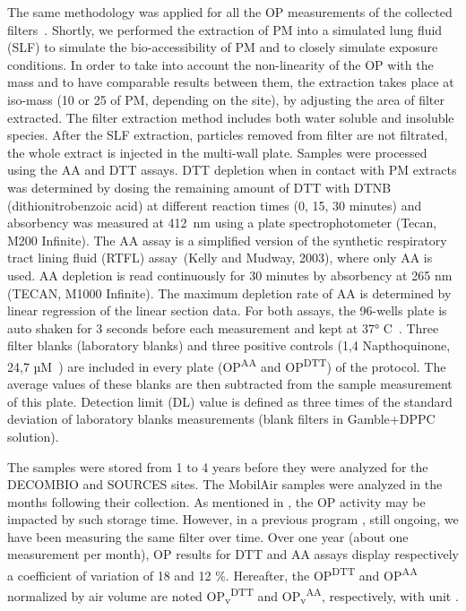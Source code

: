 \documentclass[acp]{copernicus}
\begin{document}
The same methodology was applied for all the OP measurements of the
collected filters~\citep{calasImportance2017,calasComparison2018,calasSeasonal2019}. Shortly, we
performed the extraction of PM into a simulated lung fluid (SLF) to
simulate the bio-accessibility of PM and to closely simulate exposure
conditions. In order to take into account the non-linearity of the OP
with the mass and to have comparable results between them, the
extraction takes place at iso-mass (10 or 25 of PM, depending on the
site), by adjusting the area of filter extracted. The filter extraction
method includes both water soluble and insoluble species. After the SLF
extraction, particles removed from filter are not filtrated, the whole
extract is injected in the multi-wall plate. Samples were processed
using the AA and DTT assays. DTT depletion when in contact with PM
extracts was determined by dosing the remaining amount of DTT with DTNB
(dithionitrobenzoic acid) at different reaction times (0, 15, 30
minutes) and absorbency was measured at 412~nm using a plate
spectrophotometer (Tecan, M200 Infinite). The AA assay is a simplified
version of the synthetic respiratory tract lining fluid (RTFL)
assay~(Kelly and Mudway, 2003), where only AA is used. AA depletion is
read continuously for 30 minutes by absorbency at 265 nm~ (TECAN, M1000
Infinite). The maximum depletion rate of AA is determined by linear
regression of the linear section data. For both assays, the 96-wells
plate is auto shaken for 3 seconds before each measurement and kept at
37° C~. Three filter blanks (laboratory blanks) and three positive
controls (1,4 Napthoquinone, 24,7 µM~) are included in every plate
(OP\textsuperscript{AA} and OP\textsuperscript{DTT}) of the protocol.
The average values of these blanks are then subtracted from the sample
measurement of this plate. Detection limit (DL) value is defined as
three times of the standard deviation of laboratory blanks measurements
(blank filters in Gamble+DPPC solution).

The samples were stored from 1 to 4 years before they were analyzed for
the DECOMBIO and SOURCES sites. The MobilAir samples were analyzed in
the months following their collection. As mentioned in \citet{vermaFractionating2015}, the
OP activity may be impacted by such storage time. However, in
a previous program \citep{ansesexposureEtude2017}, still ongoing, we have been
measuring the same filter over time. Over one year (about one
measurement per month), OP results for DTT and AA assays display
respectively a coefficient of variation of 18 and 12 \%. Hereafter, the
OP\textsuperscript{DTT} and OP\textsuperscript{AA} normalized by air
volume are noted OP\textsubscript{v}\textsuperscript{DTT} and
OP\textsubscript{v}\textsuperscript{AA}, respectively, with unit .
\end{document}
